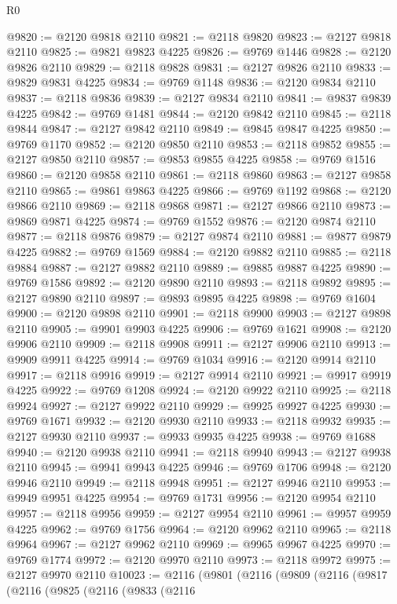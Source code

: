 \begin{lexlean}{R0}
\begin{coremodule}
@9820 := @2120 @9818 @2110
@9821 := @2118 @9820
@9823 := @2127 @9818 @2110
@9825 := @9821 @9823 @4225
@9826 := @9769 @1446
@9828 := @2120 @9826 @2110
@9829 := @2118 @9828
@9831 := @2127 @9826 @2110
@9833 := @9829 @9831 @4225
@9834 := @9769 @1148
@9836 := @2120 @9834 @2110
@9837 := @2118 @9836
@9839 := @2127 @9834 @2110
@9841 := @9837 @9839 @4225
@9842 := @9769 @1481
@9844 := @2120 @9842 @2110
@9845 := @2118 @9844
@9847 := @2127 @9842 @2110
@9849 := @9845 @9847 @4225
@9850 := @9769 @1170
@9852 := @2120 @9850 @2110
@9853 := @2118 @9852
@9855 := @2127 @9850 @2110
@9857 := @9853 @9855 @4225
@9858 := @9769 @1516
@9860 := @2120 @9858 @2110
@9861 := @2118 @9860
@9863 := @2127 @9858 @2110
@9865 := @9861 @9863 @4225
@9866 := @9769 @1192
@9868 := @2120 @9866 @2110
@9869 := @2118 @9868
@9871 := @2127 @9866 @2110
@9873 := @9869 @9871 @4225
@9874 := @9769 @1552
@9876 := @2120 @9874 @2110
@9877 := @2118 @9876
@9879 := @2127 @9874 @2110
@9881 := @9877 @9879 @4225
@9882 := @9769 @1569
@9884 := @2120 @9882 @2110
@9885 := @2118 @9884
@9887 := @2127 @9882 @2110
@9889 := @9885 @9887 @4225
@9890 := @9769 @1586
@9892 := @2120 @9890 @2110
@9893 := @2118 @9892
@9895 := @2127 @9890 @2110
@9897 := @9893 @9895 @4225
@9898 := @9769 @1604
@9900 := @2120 @9898 @2110
@9901 := @2118 @9900
@9903 := @2127 @9898 @2110
@9905 := @9901 @9903 @4225
@9906 := @9769 @1621
@9908 := @2120 @9906 @2110
@9909 := @2118 @9908
@9911 := @2127 @9906 @2110
@9913 := @9909 @9911 @4225
@9914 := @9769 @1034
@9916 := @2120 @9914 @2110
@9917 := @2118 @9916
@9919 := @2127 @9914 @2110
@9921 := @9917 @9919 @4225
@9922 := @9769 @1208
@9924 := @2120 @9922 @2110
@9925 := @2118 @9924
@9927 := @2127 @9922 @2110
@9929 := @9925 @9927 @4225
@9930 := @9769 @1671
@9932 := @2120 @9930 @2110
@9933 := @2118 @9932
@9935 := @2127 @9930 @2110
@9937 := @9933 @9935 @4225
@9938 := @9769 @1688
@9940 := @2120 @9938 @2110
@9941 := @2118 @9940
@9943 := @2127 @9938 @2110
@9945 := @9941 @9943 @4225
@9946 := @9769 @1706
@9948 := @2120 @9946 @2110
@9949 := @2118 @9948
@9951 := @2127 @9946 @2110
@9953 := @9949 @9951 @4225
@9954 := @9769 @1731
@9956 := @2120 @9954 @2110
@9957 := @2118 @9956
@9959 := @2127 @9954 @2110
@9961 := @9957 @9959 @4225
@9962 := @9769 @1756
@9964 := @2120 @9962 @2110
@9965 := @2118 @9964
@9967 := @2127 @9962 @2110
@9969 := @9965 @9967 @4225
@9970 := @9769 @1774
@9972 := @2120 @9970 @2110
@9973 := @2118 @9972
@9975 := @2127 @9970 @2110
@10023 := @2116
    (@9801
      (@2116
        (@9809
          (@2116
            (@9817
              (@2116
                (@9825
                  (@2116
                    (@9833
                      (@2116

\end{coremodule}
\end{lexlean}
